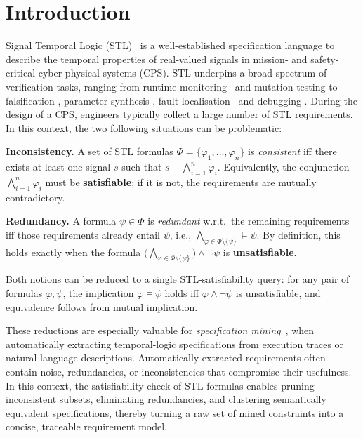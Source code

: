 \documentclass{easychair}
\begin{document}
\section{Introduction}
\label{sec:intro}





Signal Temporal Logic (STL)~\citep{MalerN04} is a well-established specification language to describe the temporal properties of real‑valued signals in mission‑ and safety‐critical cyber‑physical systems (CPS).  STL underpins a broad spectrum of verification tasks, ranging from runtime monitoring~\citep{JaksicBGKNN15} and mutation testing \citep{BartocciMNY23} to falsification \citep{SankaranarayananF12}, parameter synthesis \citep{BartocciBNS15}, fault localisation~\citep{BartocciFMN18} and debugging \citep{BartocciMMMN21}.
During the design of a CPS, engineers typically collect a large number of STL requirements.  In this context, the two following situations can be problematic:


\noindent \textbf{Inconsistency.} 
    A set of STL formulas $\Phi=\{\varphi_1,\dots,\varphi_n\}$ is \emph{consistent}
    iff there exists at least one signal $s$ such that 
    $s\models\bigwedge_{i=1}^{n}\varphi_i$.  Equivalently, the conjunction
    $\bigwedge_{i=1}^{n}\varphi_i$ must be \textbf{satisfiable}; if it is not,
    the requirements are mutually contradictory.
    
\noindent \textbf{Redundancy.}  
    A formula $\psi\in\Phi$ is \emph{redundant} w.r.t.\ the remaining
    requirements iff those requirements already entail $\psi$, i.e., 
    $\bigwedge_{\varphi\in\Phi\setminus\{\psi\}} \models \psi$.  By definition,
    this holds exactly when the formula
    $\bigl(\bigwedge_{\varphi\in\Phi\setminus\{\psi\}}\bigr)\land\neg\psi$ is
    \textbf{unsatisfiable}.

Both notions can be reduced to a single STL‑satisfiability query: for any pair of formulas $\varphi,\psi$, the implication $\varphi\models\psi$ holds iff $\varphi\land\neg\psi$ is unsatisfiable, and equivalence follows from mutual implication.





These reductions are especially valuable for \emph{specification mining}~\cite{BartocciMNN22}, when automatically extracting temporal-logic specifications from execution traces or natural-language descriptions. 
Automatically extracted requirements often contain noise, redundancies, or inconsistencies that compromise their usefulness.
In this context, the satisfiability check of STL formulas enables pruning inconsistent subsets, eliminating redundancies, and clustering semantically equivalent specifications, thereby turning a raw set of mined constraints into a concise, traceable requirement model.
\end{document}
